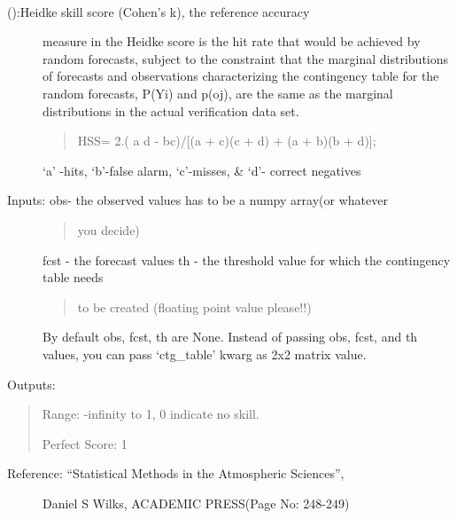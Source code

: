 \documentclass[letterpaper,10pt,english]{sphinxmanual}
\begin{document}

\begin{fulllineitems}
\label{diagnosis:ctgfunction.hss}~\begin{description}
\item[{{\hyperref[diagnosis:ctgfunction.hss]{}} ():Heidke skill score (Cohen's k), the reference accuracy}] \leavevmode
measure in the Heidke score is the hit rate that would be
achieved by random forecasts, subject to the constraint that
the marginal distributions of forecasts and observations
characterizing the contingency table for the random forecasts,
P(Yi) and p(oj), are the same as the marginal distributions in
the actual verification data set.
\begin{quote}

HSS= 2.( a d - bc)/{[}(a + c)(c + d) + (a + b)(b + d){]};
\end{quote}

`a' -hits, `b'-false alarm, `c'-misses, \& `d'- correct  negatives

\item[{Inputs: obs- the observed values has to be a numpy array(or whatever}] \leavevmode\begin{quote}

you decide)
\end{quote}

fcst - the forecast values
th  - the threshold value for which the contingency table needs
\begin{quote}

to be created (floating point value please!!)
\end{quote}

By default obs, fcst, th are None. Instead of passing obs, fcst,
and th values, you can pass `ctg\_table' kwarg as 2x2 matrix value.

\end{description}

Outputs:
\begin{quote}

Range: -infinity to 1, 0 indicate no skill.

Perfect Score: 1
\end{quote}
\begin{description}
\item[{Reference: ``Statistical Methods in the Atmospheric Sciences'',}] \leavevmode
Daniel S Wilks, ACADEMIC PRESS(Page No: 248-249)


\end{description}
\end{fulllineitems}
\end{document}
